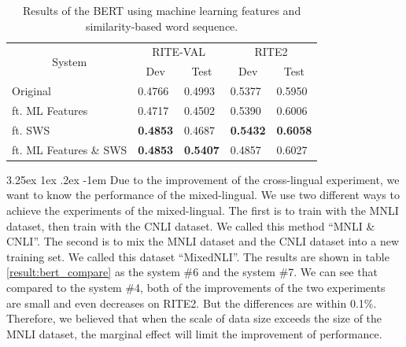 \documentclass[12pt]{article}
\makeatletter
\renewcommand\paragraph{\@startsection{paragraph}{5}{\z@}%
  {3.25ex \@plus1ex \@minus.2ex}%
  {-1em}%
  {\normalfont\normalsize\bfseries}}
\makeatother
\begin{document}
\begin{CJK*}{UTF8}{bkai}
\begin{spacing}{1.77}
\begin{table}[H]
  \centering
  \setlength{\extrarowheight}{-3pt}
  \caption{Results of the BERT using machine learning features and similarity-based word sequence.}
  \label{result:bert_csa_mlft_comparison}
  \begin{tabular}{|l|l|l|l|l|}
  \hline
  \multicolumn{1}{|c|}{\multirow{2}{*}{System}} & \multicolumn{2}{c|}{RITE-VAL} & \multicolumn{2}{c|}{RITE2} \\ \cline{2-5}
  \multicolumn{1}{|c|}{} & \multicolumn{1}{c|}{Dev} & \multicolumn{1}{c|}{Test} & \multicolumn{1}{c|}{Dev} & \multicolumn{1}{c|}{Test} \\ \hline
  Original & 0.4766 & 0.4993 & 0.5377 & 0.5950 \\ \hline
  ft. ML Features & 0.4717 & 0.4502 & 0.5390 & 0.6006 \\ \hline
  ft. SWS & \textbf{0.4853} & 0.4687 & \textbf{0.5432} & \textbf{0.6058} \\ \hline
  ft. ML Features \& SWS & \textbf{0.4853} & \textbf{0.5407} & 0.4857 & 0.6027 \\ \hline
  \end{tabular}
\end{table}

\paragraph{}
Due to the improvement of the cross-lingual experiment, we want to know the performance of the mixed-lingual. We use two different ways to achieve the experiments of the mixed-lingual. The first is to train with the MNLI dataset, then train with the CNLI dataset. We called this method ``MNLI \& CNLI''. The second is to mix the MNLI dataset and the CNLI dataset into a new training set. We called this dataset ``MixedNLI''. The results are shown in table \ref{result:bert_compare} as the system \#6 and the system \#7. We can see that compared to the system \#4, both of the improvements of the two experiments are small and even decreases on RITE2. But the differences are within 0.1\%. Therefore, we believed that when the scale of data size exceeds the size of the MNLI dataset, the marginal effect will limit the improvement of performance.


\end{spacing}
\end{CJK*}
\end{document}

